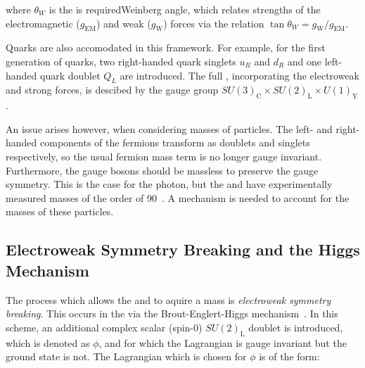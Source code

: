 where $\theta_{W}$ is the  is requiredWeinberg angle, which relates strengths of the electromagnetic ($g_{\textrm{EM}}$) and weak ($g_{\textrm{W}}$) forces via the relation $\tan \theta_{W} = g_{\textrm{W}} /g_{\textrm{EM}}$.

 Quarks are also accomodated in this framework. For example, for the first generation of quarks, two right-handed quark singlets $u_{R}$ and $d_{R}$ and one left-handed quark doublet $Q_{L}$ are introduced. The full \SM, incorporating the electroweak and strong forces, is descibed by the gauge group $SU(3)_{\textrm{C}} \times SU(2)_{\textrm{L}} \times U(1)_{\textrm{Y}}$.
 
 
An issue arises however, when considering masses of particles. 
The left- and right-handed components of the fermions transform as doublets and singlets respectively, so the usual fermion mass term is no longer gauge invariant.
Furthermore, the gauge bosons should be massless to preserve the gauge symmetry. This is the case for the photon, but the \PWpm and \PZzero have experimentally measured masses of the order of 90\GeV~\cite{PDGBooklet}. A mechanism is needed to account for the masses of these particles. 

\subsection{Electroweak Symmetry Breaking and the Higgs Mechanism}
\label{sec:th:ewsb}

The process which allows the \PWpm and \PZzero to aquire a mass is \emph{electroweak symmetry breaking}. This occurs in the \SM via the Brout-Englert-Higgs mechanism~\cite{Englert:1964et,Higgs:1964ia,Higgs:1964pj,Guralnik:1964eu,Higgs:1966ev,Kibble:1967sv}. In this scheme, an additional complex scalar (spin-0) $SU(2)_{\mathrm{L}}$ doublet is introduced, which is denoted as $\phi$, and for which the Lagrangian is gauge invariant but the ground state is not. 
The Lagrangian which is chosen for $\phi$ is of the form:

